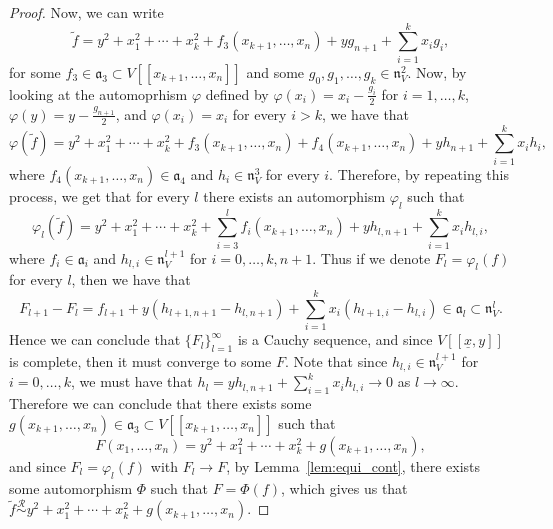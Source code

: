\documentclass{article}
\newcommand{\equivr}{\overset{\mathcal{R}}{\sim}}
\newcommand{\naxV}{\mathfrak{n}_V}
\numberwithin{theorem}{section}
\begin{document}
\begin{proof}
    Now, we can write 
    \begin{equation*}
        \tilde{f} = y^2 +x_1^2 + \cdots + x_k^2 + f_3\left(x_{k+1}, \dots, x_n\right)  + yg_{n+1} + \sum_{i=1}^k x_i g_i,
    \end{equation*}
    \noindent for some $f_3 \in  \mathfrak{a}_3 \subset V[[x_{k+1}, \dots, x_n]]$ and some $g_0, g_1, \dots, g_k \in \naxV^2$.  Now, by looking at the automoprhism $\varphi$ defined by $\varphi(x_i)= x_i - \frac{g_i}{2}$ for $i=1,\dots, k$, $\varphi(y) = y - \frac{g_{n+1}}{2}$, and $\varphi(x_i)=x_i$ for every $i>k$, we have that 
    \begin{equation*}
        \varphi(\tilde{f}) = y^2 +x_1^2 + \cdots + x_k^2 + f_3(x_{k+1}, \dots, x_n) + f_4(x_{k+1}, \dots, x_n)  + yh_{n+1} + \sum_{i=1}^k x_i h_i,
    \end{equation*}
    \noindent where $f_4\left(x_{k+1}, \dots, x_n\right) \in \mathfrak{a}_4$ and $h_i \in \naxV^3$ for every $i$. Therefore, by repeating this process, we get that for every $l$ there exists an automorphism $\varphi_l$ such that
     \begin{equation*}
        \varphi_l(\tilde{f}) = y^2 +x_1^2 + \cdots + x_k^2 + \sum_{i=3}^l f_i\left(x_{k+1}, \dots, x_n\right) + y h_{l,n+1} + \sum_{i=1}^k x_i h_{l,i},
    \end{equation*}
    \noindent where $f_i \in \mathfrak{a}_i$ and $h_{l,i} \in \naxV^{l+1}$ for $i=0, \dots, k, n+1$. Thus if we denote $F_l=\varphi_l(f)$ for every $l$, then we have that
    \begin{equation*}
        F_{l+1}-F_l = f_{l+1} +  y(h_{l+1,n+1}-h_{l,n+1})+\sum_{i=1}^k x_i (h_{l+1,i}-h_{l,i}) \in \mathfrak{a}_l  \subset \naxV^l. 
    \end{equation*}
    \noindent Hence we can conclude that $\{F_l\}_{l=1}^\infty$ is a Cauchy sequence, and since $V[[\underline{x},y]]$ is complete, then it must converge to some $F$. Note that since $h_{l,i} \in \naxV^{l+1}$ for $i=0, \dots, k$, we must have that $h_l=  y h_{l,n+1} + \sum_{i=1}^k x_i h_{l,i} \to 0$ as $l \to \infty$. Therefore we can conclude that there exists some $g(x_{k+1}, \dots, x_n) \in \mathfrak{a}_3 \subset V[[x_{k+1}, \dots, x_n]]$  such that 
    \begin{equation*}
        F(x_1, \dots, x_n) =  y^2 +x_1^2 + \cdots + x_k^2  + g(x_{k+1}, \dots, x_n),
    \end{equation*}
    \noindent and since $F_l=\varphi_l(f)$ with $F_l \to F$, by Lemma~\ref{lem:equi_cont}, there exists some automorphism $\Phi$ such that $F=\Phi(f)$, which gives us that $\tilde{f} \equivr  y^2 + x_1^2 +\cdots + x_k^2 + g\left(x_{k+1}, \dots, x_n\right)$.  
\end{proof}
\end{document}
